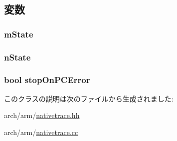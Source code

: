 \subsection{変数}
\hypertarget{classTrace_1_1ArmNativeTrace_a72f1181d2c4bc9244a9bea747b68881f}{
\subsubsection[{mState}]{ {\bf mState}}}
\label{classTrace_1_1ArmNativeTrace_a72f1181d2c4bc9244a9bea747b68881f}
\hypertarget{classTrace_1_1ArmNativeTrace_a9b1e159170b558aeaa3694f2183d4d68}{
\subsubsection[{nState}]{ {\bf nState}}}
\label{classTrace_1_1ArmNativeTrace_a9b1e159170b558aeaa3694f2183d4d68}
\hypertarget{classTrace_1_1ArmNativeTrace_a6fa1bc6237b1cf2fae7eadeb1daafe32}{
\subsubsection[{stopOnPCError}]{\setlength{\rightskip}{0pt plus 5cm}bool {\bf stopOnPCError}}}
\label{classTrace_1_1ArmNativeTrace_a6fa1bc6237b1cf2fae7eadeb1daafe32}


このクラスの説明は次のファイルから生成されました:\begin{DoxyCompactItemize}
\item 
arch/arm/\hyperlink{arch_2arm_2nativetrace_8hh}{nativetrace.hh}\item 
arch/arm/\hyperlink{arch_2arm_2nativetrace_8cc}{nativetrace.cc}\end{DoxyCompactItemize}
